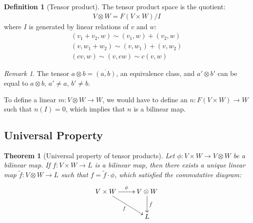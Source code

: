 \documentclass{article}
\newtheorem{Theorem}{Theorem}
\theoremstyle{definition}
\newtheorem{Definition}{Definition}
\theoremstyle{remark}
\newtheorem*{Remark*}{Remark}
\theoremstyle{underline}
\theoremstyle{underline}
\begin{document}
	\begin{Definition}[Tensor product]
		The tensor product space is the quotient:
		\begin{gather*}
		V \otimes W = F(V \times W)/I
		\end{gather*}
		where $I$ is generated by linear relations of $v$ and $w$:
		\begin{gather*}
		(v_1 + v_2, w) \sim (v_1, w) + (v_2, w) \\
		(v, w_1 + w_2) \sim (v, w_1) + (v, w_2) \\
		(cv, w) \sim (v, cw) \sim c(v, w)
		\end{gather*}
	\end{Definition}
	
	\begin{Remark*}
		The tensor $a \otimes b = \overline{(a,b)}$, an equivalence class, and $a' \otimes b'$ can be equal to $a \otimes b,\, a' \neq a, \, b' \neq b$.
	\end{Remark*}
	
	To define a linear $m\colon V \otimes W \to W$, we would have to define an $n\colon F(V \times W) \to W$ such that $n(I) = 0$, which implies that $n$ is a bilinear map. 

	\subsection{Universal Property}

	\begin{Theorem}[Universal property of tensor products]
		Let $\phi \colon V \times W \to V \otimes W$ be a bilinear map. If $f \colon V \times W \to L$ is a bilinear map, then there exists a unique linear map $\tilde f \colon V \otimes W \to L$ such that $f = \tilde f \cdot \phi $, which satisfied the commutative diagram:
		\begin{gather*}
		\xymatrix{
		V \times W \ar[r]^{\phi} \ar[rd]_{f} & V \otimes W \ar[d]^{\tilde f} \\
		& L
		}
		\end{gather*}
	\end{Theorem}
\end{document}
